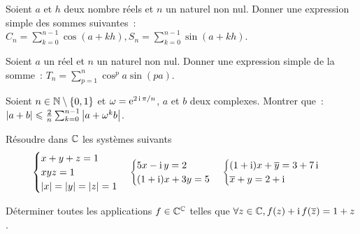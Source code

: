 \begin{exercice}
  Soient \(a\) et \(h\) deux nombre réels et \(n\) un naturel non nul. Donner 
  une expression simple des sommes suivantes~: \( C_n = \sum_{k = 0}^{n-1} 
  \cos(a + kh), S_n = \sum_{k = 0}^{n-1} \sin(a + kh)\).
\end{exercice}

\begin{exercice}
  Soient \(a\) un réel et \(n\) un naturel non nul. Donner une expression 
  simple de la somme~: \(T_n = \sum_{p = 1}^n \cos^p a \sin(pa)\).
\end{exercice}

\begin{exercice}
  Soient \(n \in{}\mathbb{N}\setminus\{0,1\}\) et \(\omega = \operatorname{e}^{2\operatorname{i}\pi/n}\), \(a\) et 
  \(b\) deux complexes. Montrer que~: \(\left\lvert a + b\right\rvert \leqslant \frac{2}{n} 
  \sum_{k = 0}^{n-1} \left\lvert a + \omega^k b\right\rvert\).
\end{exercice}

\begin{exercice}
  Résoudre dans \(\mathbb{C}\) les systèmes suivants
  \begin{equation}
    \begin{cases} x + y + z = 1 \\ xyz = 1 \\ \left\lvert x\right\rvert = \left\lvert y\right\rvert = \left\lvert z\right\rvert = 
    1 \end{cases}
    \begin{cases} 5x-\operatorname{i}{}y = 2 \\ (1 + \operatorname{i})x + 3y = 5 \end{cases}
      \begin{cases} (1 + \operatorname{i})x + \overline{y} = 3 + 7\operatorname{i}{}\\\overline{x} + y = 2 + 
      \operatorname{i}\end{cases}
  \end{equation}
\end{exercice}

\begin{exercice}
  Déterminer toutes les applications \(f \in{}\mathbb{C}^{\mathbb{C}}\) telles que \(\forall z 
  \in{}\mathbb{C}, f(z) + \operatorname{i}{}f(\overline{z}) = 1 + z\).
\end{exercice}

